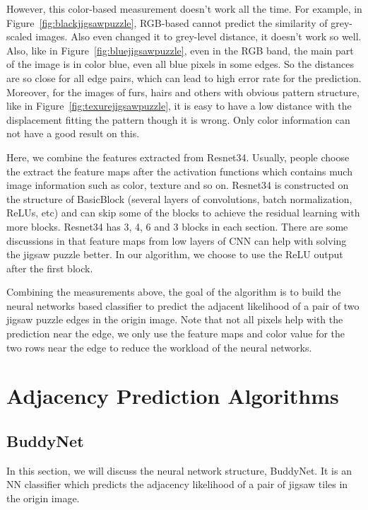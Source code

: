 \documentclass{article}
\begin{document}
However, this color-based measurement doesn't work all the time. For example, in Figure~\ref{fig:blackjigsawpuzzle}, RGB-based cannot predict the similarity of grey-scaled images. Also even changed it to grey-level distance, it doesn't work so well. Also, like in Figure~\ref{fig:bluejigsawpuzzle}, even in the RGB band, the main part of the image is in color blue, even all blue pixels in some edges. So the distances are so close for all edge pairs, which can lead to high error rate for the prediction. Moreover, for the images of furs, hairs and others with obvious pattern structure, like in Figure~\ref{fig:texurejigsawpuzzle}, it is easy to have a low distance with the displacement fitting the pattern though it is wrong. Only color information can not have a good result on this.

Here, we combine the features extracted from Resnet34\cite{he2016deep}. Usually, people choose the extract the feature maps after the activation functions which contains much image information such as color, texture and so on. Resnet34 is constructed on the structure of BasicBlock (several layers of convolutions, batch normalization, ReLUs, etc) and can skip some of the blocks to achieve the residual learning with more blocks. Resnet34 has 3, 4, 6 and 3 blocks in each section. There are some discussions in \cite{noroozi2016unsupervised} that feature maps from low layers of CNN can help with solving the jigsaw puzzle better. In our algorithm, we choose to use the ReLU output after the first block.

Combining the measurements above, the goal of the algorithm is to build the neural networks based classifier to predict the adjacent likelihood of a pair of two jigsaw puzzle edges in the origin image. Note that not all pixels help with the prediction near the edge, we only use the feature maps and color value for the two rows near the edge to reduce the workload of the neural networks.

\section{Adjacency Prediction Algorithms}

\subsection{BuddyNet}

In this section, we will discuss the neural network structure, BuddyNet. It is an NN classifier which predicts the adjacency likelihood of a pair of jigsaw tiles in the origin image.
\end{document}
